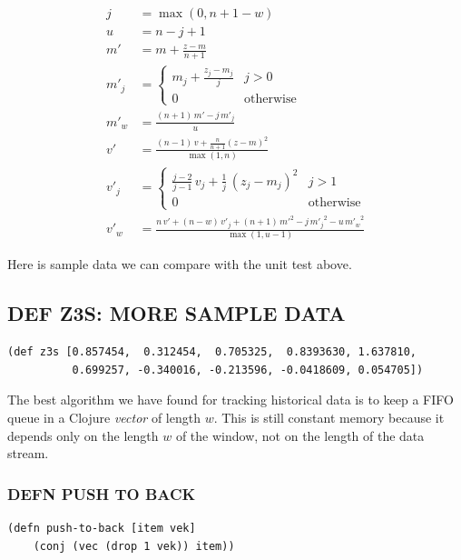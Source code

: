 \documentclass[10pt,oneside,x11names]{article}
\begin{document}
\begin{align*}
j     &= \max(0,n+1-w)               \\
u     &= n-j+1                       \\
m'    &= m+\frac{z-m}{n+1}           \\
m'_j  &= \begin{cases}
  m_j+\frac{z_j-m_j}{j} & j>0        \\
  0 & \mathrm{otherwise}
\end{cases}                          \\
m'_w  &= \frac{(n+1)\,m'-j\,m'_j}{u} \\
v'    &= \frac{(n-1)\,v+\frac{n}{n+1}\left(z-m\right)^2}{\max(1,n)}   \\
v'_j  &= \begin{cases}
  \frac{j-2}{j-1}\,v_j+\frac{1}{j}\,\left(z_j-m_j\right)^2 & j>1      \\
  0 & \mathrm{otherwise}
\end{cases}                                                           \\
v'_w  &= \frac{n\,v'+(n-w)\,v'_j+(n+1)\,{m'}^2-j\,{m'_j}^2-u\,{m'_w}^2}{\max(1,u-1)}
\end{align*}

Here is sample data we can compare with the unit test above.

\subsection{DEF Z3S: MORE SAMPLE DATA}
\label{sec:org8ff75c0}
\begin{verbatim}
(def z3s [0.857454,  0.312454,  0.705325,  0.8393630, 1.637810,
          0.699257, -0.340016, -0.213596, -0.0418609, 0.054705])
\end{verbatim}

The best algorithm we have found for tracking historical data is to keep
a FIFO queue in a Clojure \emph{vector} of length \(w\). This is still constant
memory because it depends only on the length \(w\) of the window, not on
the length of the data stream.

\subsubsection{DEFN PUSH TO BACK}
\label{sec:org7584713}

\begin{verbatim}
(defn push-to-back [item vek]
    (conj (vec (drop 1 vek)) item))
\end{verbatim}
\end{document}
